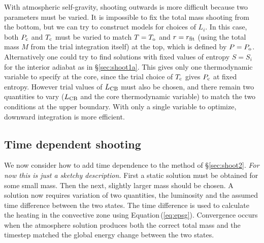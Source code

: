 \documentclass[12pt, preprint,numberedappendix]{emulateapj}
\newcommand{\Eq}[1]{Equation\,(\ref{#1})}
\newcommand{\Rg}{\mathcal{R}}
\newcommand{\co}{_{\rm c}}
\newcommand{\di}{_{\rm o}}
\newcommand{\cb}{_{\rm CB}}
\begin{document}
With atmospheric self-gravity, shooting outwards is more difficult because two parameters must be varied.  It is impossible to fix the total mass shooting from the bottom, but we can try to construct models for choices of $L_i$.  In this case,  both $P\co$ and $T\co$ must be varied to match $T = T\di$ and $r = r_{\rm fit}$ (using the total mass $M$ from the trial integration itself) at the top, which is defined by $P = P\di$.  Alternatively one could try to find solutions with fixed values of entropy $S = S_i$ for the interior adiabat as in \S\ref{sec:shoot1a}.  This gives only one thermodynamic variable to specify at the core, since the trial choice of $T\co$ gives $P\co$ at fixed entropy.  However trial values of $L\cb$ must also be chosen, and there remain two quantities to vary ($L\cb$ and the core thermodynamic variable) to match the two conditions at the upper boundary.  With only a single variable to optimize, downward integration is more efficient.  

\subsection{Time dependent shooting}\label{sec:timedep}
We now consider how to add time dependence to the method of \S\ref{sec:shoot2}.  \emph{For now this is just a sketchy description.}  First a static solution must be obtained for some small mass.  Then the next, slightly larger mass should be chosen.    A solution now requires variation of two quantities, the luminosity and the assumed time difference between the two states.  The time difference is used to calculate the heating in the convective zone using \Eq{eq:epsg}.  Convergence occurs when the atmosphere solution produces both the correct total mass and the timestep matched the global energy change between the two states. 

\end{document}
